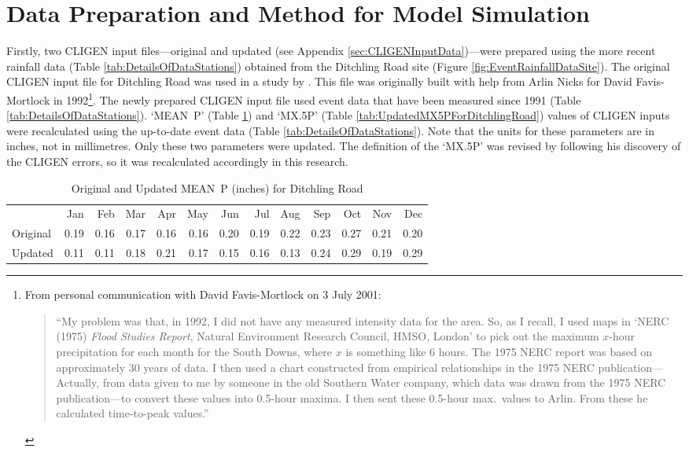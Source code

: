 \section{Data Preparation and Method for Model Simulation}
\label{sec:ImprovedCligenMethods}
Firstly, two CLIGEN input files---original and updated (see Appendix
\ref{sec:CLIGENInputData})---were prepared using the more recent rainfall data
(Table \ref{tab:DetailsOfDataStations}) obtained from the Ditchling Road site
(Figure \ref{fig:EventRainfallDataSite}). The original CLIGEN input file for
Ditchling Road was used in a study by \citet{favis-mortlock1998-141}. This file
was originally built with help from Arlin Nicks for David Favis-Mortlock in
1992\footnote{From personal communication with David Favis-Mortlock on 3 July
2001: \begin{quotation} ``My problem was that, in 1992, I did not have any
measured intensity data for the area. So, as I recall, I used maps in `NERC
(1975) \textit{Flood Studies Report}, Natural Environment Research Council,
HMSO, London' to pick out the maximum $x$-hour precipitation for each month for
the South Downs, where $x$ is something like 6 hours. The 1975 NERC report was
based on approximately 30 years of data. I then used a chart constructed from
empirical relationships in the 1975 NERC publication---Actually, from data given
to me by someone in the old Southern Water company, which data was drawn from
the 1975 NERC publication---to convert these values into 0.5-hour maxima. I then
sent these 0.5-hour max.\ values to Arlin. From these he calculated time-to-peak
values.'' \end{quotation}}. The newly prepared CLIGEN input file used event data
that have been measured since 1991 (Table \ref{tab:DetailsOfDataStations}).
`MEAN~P' (Table \ref{tab:UpdatedMEANPForDitchlingRoad}) and `{MX.5P}' (Table
\ref{tab:UpdatedMX5PForDitchlingRoad}) values of CLIGEN inputs were recalculated
using the up-to-date event data (Table \ref{tab:DetailsOfDataStations}). Note
that the units for these parameters are in inches, not in millimetres. Only
these two parameters were updated. The definition of the `{MX.5P}' was revised
by \citet{yu2000-301} following his discovery of the CLIGEN errors, so it was
recalculated accordingly in this research.

\begin{table}[htbp]
  \centering
  \caption[Original and Updated MEAN~P for Ditchling Road]{Original and
Updated MEAN~P (inches) for Ditchling Road}
  \label{tab:UpdatedMEANPForDitchlingRoad}
    \footnotesize
    \begin{tabular}{lrrrrrrrrrrrr}
    \toprule
     & Jan & Feb & Mar & Apr & May & Jun & Jul & Aug & Sep & Oct &
Nov & Dec\\
    \cmidrule{2-13}
    Original & 0.19 & 0.16 & 0.17 & 0.16 & 0.16 & 0.20 & 0.19 & 0.22
& 0.23 & 0.27 & 0.21 & 0.20\\
    Updated & 0.11 & 0.11 & 0.18 & 0.21 & 0.17 & 0.15 & 0.16 & 0.13
& 0.24 & 0.29 & 0.19 & 0.29\\
    \bottomrule
    \end{tabular}
\end{table}

